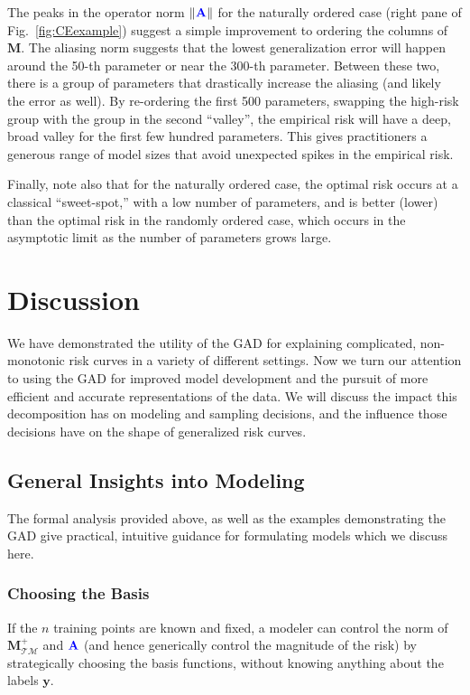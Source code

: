 \documentclass[twocolumn,aps,prx,superscriptaddress,10pt]{revtex4-2}
\newcommand{\by}{\bm{y}}
\newcommand{\0}{\bm{0}}
\newcommand{\M}{\mathcal{M}} %
\newcommand{\T}{\mathcal{T}} %
\newcommand{\bbA}{{\color{blue}{\mathbf{A}}}}  %
\newcommand{\bbM}{\mathbf{M}}
\newcommand{\MTM}{\bbM_{\T\M}}
\begin{document}
The peaks in the operator norm $\|\bbA\|$ for the naturally ordered case (right pane of Fig.~\ref{fig:CEexample}) suggest a simple improvement to ordering the columns of $\bbM$. The aliasing norm suggests that the lowest generalization error will happen around the 50-th parameter or near the 300-th parameter. Between these two, there is a group of parameters that drastically increase the aliasing (and  likely the error as well). By re-ordering the first 500 parameters, swapping the high-risk group with the group in the second ``valley'', the empirical risk will have a deep, broad valley for the first few hundred parameters. This gives practitioners a generous range of model sizes that avoid unexpected spikes in the empirical risk. 

Finally, note also that for the naturally ordered case, the optimal risk occurs at a classical ``sweet-spot,'' with a low number of parameters, and is better (lower) than the optimal risk in the randomly ordered case, which occurs in the asymptotic limit as the number of parameters grows large.



\section{Discussion}\label{sec:discussion}

We have demonstrated the utility of the GAD for explaining complicated, non-monotonic risk curves in a variety of different settings.  Now we turn our attention to using the GAD for improved model development and the pursuit of more efficient and accurate representations of the data.  We will discuss the impact this decomposition has on modeling and sampling decisions, and the influence those decisions have on the shape of generalized risk curves.
%

\subsection{General Insights into Modeling}

The formal analysis provided above, as well as the examples demonstrating the GAD give practical, intuitive guidance for formulating models which we discuss here.


\subsubsection{Choosing the Basis}
If the $n$ training points are known and fixed, a modeler can control the norm of $\MTM^+$ and $\bbA$ (and hence generically control the magnitude of the risk) by strategically choosing the basis functions, without knowing anything about the labels $\by$.
\end{document}
